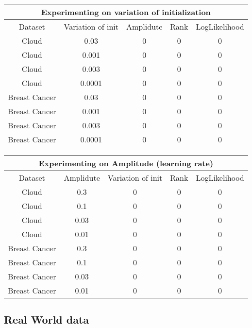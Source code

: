 \documentclass[a4paper]{article}
\begin{document}
\begin{center}
    \begin{tabular}{||c c c c c||} 
     \hline
     \multicolumn{5}{|c|}{Experimenting on variation of initialization} \\
     \hline
     Dataset & Variation of init & Amplidute & Rank & LogLikelihood \\ [0.5ex] 
     \hline\hline
     Cloud & 0.03 & 0 & 0 & 0 \\
     \hline
     Cloud & 0.001 & 0 & 0 & 0 \\ 
     \hline
     Cloud & 0.003 & 0 & 0 & 0 \\ 
     \hline
     Cloud & 0.0001 & 0 & 0 & 0 \\ 
     \hline
     Breast Cancer & 0.03 & 0 & 0 & 0 \\
     \hline
     Breast Cancer & 0.001 & 0 & 0 & 0 \\ 
     \hline
     Breast Cancer & 0.003 & 0 & 0 & 0 \\ 
     \hline
     Breast Cancer & 0.0001 & 0 & 0 & 0 \\[1ex] 
     \hline
    \end{tabular}
\end{center}

\begin{center}
    \begin{tabular}{||c c c c c||} 
     \hline
     \multicolumn{5}{|c|}{Experimenting on Amplitude (learning rate)} \\
     \hline
     Dataset & Amplidute & Variation of init & Rank & LogLikelihood \\ [0.5ex] 
     \hline\hline
     Cloud & 0.3 & 0 & 0 & 0 \\
     \hline
     Cloud & 0.1 & 0 & 0 & 0 \\ 
     \hline
     Cloud & 0.03 & 0 & 0 & 0 \\ 
     \hline
     Cloud & 0.01 & 0 & 0 & 0 \\ 
     \hline
     Breast Cancer & 0.3 & 0 & 0 & 0 \\
     \hline
     Breast Cancer & 0.1 & 0 & 0 & 0 \\ 
     \hline
     Breast Cancer & 0.03 & 0 & 0 & 0 \\ 
     \hline
     Breast Cancer & 0.01 & 0 & 0 & 0 \\ [1ex] 
     \hline
    \end{tabular}
\end{center}

\subsection{Real World data}



\end{document}

